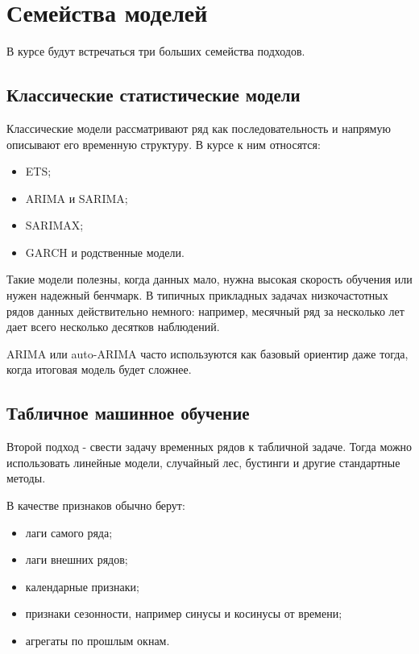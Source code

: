 \documentclass[12pt,fleqn]{article}
\begin{document}
\section{Семейства моделей}


В курсе будут встречаться три больших семейства подходов.


\subsection{Классические статистические модели}


Классические модели рассматривают ряд как последовательность и напрямую описывают его временную структуру.
В курсе к ним относятся:

\begin{itemize}
  \item ETS;
  \item ARIMA и SARIMA;
  \item SARIMAX;
  \item GARCH и родственные модели.
\end{itemize}

Такие модели полезны, когда данных мало, нужна высокая скорость обучения или нужен надежный бенчмарк.
В типичных прикладных задачах низкочастотных рядов данных действительно немного: например, месячный ряд за несколько лет дает всего несколько десятков наблюдений.

ARIMA или auto-ARIMA часто используются как базовый ориентир даже тогда, когда итоговая модель будет сложнее.


\subsection{Табличное машинное обучение}


Второй подход - свести задачу временных рядов к табличной задаче.
Тогда можно использовать линейные модели, случайный лес, бустинги и другие стандартные методы.

В качестве признаков обычно берут:

\begin{itemize}
  \item лаги самого ряда;
  \item лаги внешних рядов;
  \item календарные признаки;
  \item признаки сезонности, например синусы и косинусы от времени;
  \item агрегаты по прошлым окнам.
\end{itemize}
\end{document}
